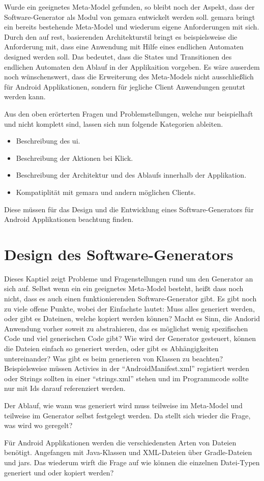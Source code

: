 Wurde ein geeignetes Meta-Model gefunden, so bleibt noch der Aspekt, dass der Software-Generator als Modul von \acf{gemara} entwickelt werden soll. \acs{gemara} bringt ein bereits bestehende Meta-Model und wiederum eigene Anforderungen mit sich. Durch den auf \acf{rest}, basierenden Architekturstil bringt es beispielsweise die Anforderung mit, dass eine Anwendung mit Hilfe eines endlichen Automaten designed werden soll. Das bedeutet, dass die States und Transitionen des endlichen Automaten den Ablauf in der Applikaition vorgeben.
Es wäre auserdem noch wünschenswert, dass die Erweiterung des Meta-Models nicht ausschließlich für Android Applikationen, sondern für jegliche Client Anwendungen genutzt werden kann.

Aus den oben erörterten Fragen und Problemstellungen, welche nur beispielhaft und nicht komplett sind, lassen sich nun folgende Kategorien ableiten.

\begin{itemize}
	\item Beschreibung des \acl{ui}.
	\item Beschreibung der Aktionen bei Klick.
	\item Beschreibung der Architektur und des Ablaufs innerhalb der Applikation.
	\item Kompatiplität mit \acs{gemara} und andern möglichen Clients. 
\end{itemize}

Diese müssen für das Design und die Entwicklung eines Software-Generators für Android Applikationen beachtung finden.

\section{Design des Software-Generators}

Dieses Kaptiel zeigt Probleme und Fragenstellungen rund um den Generator an sich auf. Selbst wenn ein ein geeignetes Meta-Model besteht, heißt dass noch nicht, dass es auch einen funktionierenden Software-Generator gibt. Es gibt noch zu viele offene Punkte, wobei der Einfachste lautet: Muss alles generiert werden, oder gibt es Dateinen, welche kopiert werden können? Macht es Sinn, die Andorid Anwendung vorher soweit zu abstrahieren, das es möglichst wenig spezifischen Code und viel generischen Code gibt? Wie wird der Generator gesteuert, können die Dateien einfach so generiert werden, oder gibt es Abhängigkeiten untereinander? Was gibt es beim generieren von Klassen zu beachten? Beispielsweise müssen Activies in der \enquote{AndroidManifest.xml} registiert werden oder Strings sollten in einer \enquote{strings.xml} stehen und im Programmcode sollte nur mit Ids darauf referenziert werden.

Der Ablauf, wie wann was generiert wird muss teilweise im Meta-Model und teilweise im Generator selbst festgelegt werden. Da stellt sich wieder die Frage, was wird wo geregelt? 

Für Android Applikationen werden die verschiedensten Arten von Dateien benötigt. Angefangen mit Java-Klassen und XML-Dateien über Gradle-Dateien und \acfp{jar}.
Das wiederum wirft die Frage auf wie können die einzelnen Datei-Typen generiert und oder kopiert werden?
